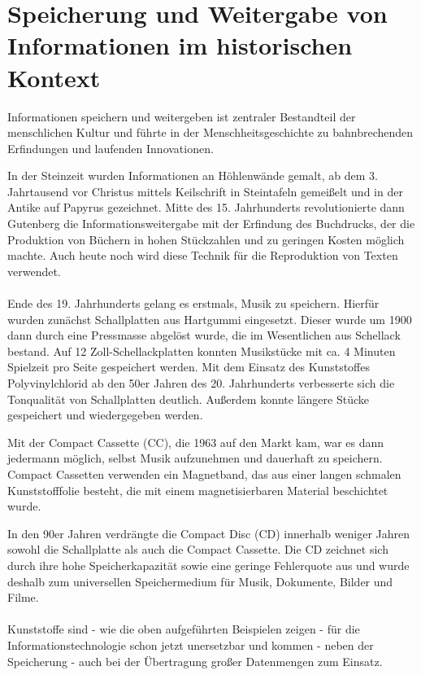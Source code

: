 \section{Speicherung und Weitergabe von Informationen im historischen Kontext}

Informationen speichern und weitergeben ist zentraler Bestandteil der menschlichen Kultur und führte 
in der Menschheitsgeschichte zu bahnbrechenden Erfindungen und laufenden Innovationen.

In der Steinzeit wurden Informationen an Höhlenwände gemalt, ab dem 3. Jahrtausend vor Christus
mittels Keilschrift in Steintafeln gemeißelt und in der Antike auf Papyrus gezeichnet. Mitte
des 15. Jahrhunderts revolutionierte dann Gutenberg die Informationsweitergabe mit der Erfindung des
Buchdrucks, der die Produktion von Büchern in hohen Stückzahlen und zu geringen Kosten möglich
machte. Auch heute noch wird diese Technik für die Reproduktion von Texten verwendet.

\paragraph{}
Ende des 19. Jahrhunderts gelang es erstmals, Musik zu speichern. Hierfür wurden zunächst
Schallplatten aus Hartgummi eingesetzt. Dieser wurde um 1900 dann durch eine Pressmasse abgelöst
wurde, die im Wesentlichen aus Schellack bestand. Auf 12 Zoll-Schellackplatten konnten Musikstücke
mit ca. 4 Minuten Spielzeit pro Seite gespeichert werden. Mit dem Einsatz des Kunststoffes
Polyvinylchlorid ab den 50er Jahren des 20. Jahrhunderts verbesserte sich die Tonqualität von
Schallplatten deutlich. Außerdem konnte längere Stücke gespeichert und wiedergegeben werden.
\cite{schallplatte1}

Mit der Compact Cassette (CC), die 1963 auf den Markt kam, war es dann jedermann möglich, selbst
Musik aufzunehmen und dauerhaft zu speichern. Compact Cassetten verwenden ein Magnetband, das aus
einer langen schmalen Kunststofffolie besteht, die mit einem magnetisierbaren Material beschichtet
wurde. \cite{kassette1} \cite{kassette2}

In den 90er Jahren verdrängte  die Compact Disc (CD) innerhalb weniger Jahren sowohl die
Schallplatte als auch die Compact Cassette. Die CD zeichnet sich durch ihre hohe Speicherkapazität
sowie eine geringe Fehlerquote aus und wurde deshalb zum universellen Speichermedium für Musik, Dokumente,
Bilder und Filme. \cite{cd_durchbruch}

\paragraph{}
Kunststoffe sind - wie die oben aufgeführten Beispielen zeigen - für die Informationstechnologie
schon jetzt unersetzbar und kommen - neben der Speicherung - auch bei der Übertragung großer
Datenmengen zum Einsatz.

